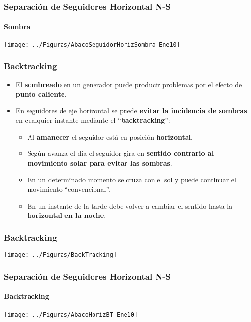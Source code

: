 \documentclass[serif, xcolor=dvipsnames]{beamer}
\begin{document}
\begin{frame}
\frametitle{Separación de Seguidores Horizontal N-S}


\framesubtitle{Sombra}

\begin{center}
\texttt{[image: ../Figuras/AbacoSeguidorHorizSombra\_Ene10]}
\par\end{center}


\end{frame}

\begin{frame}
\frametitle{Backtracking}
\begin{itemize}
\item El \textbf{sombreado} en un generador puede producir problemas por
el efecto de \textbf{punto caliente}.
\item En seguidores de eje horizontal se puede \textbf{evitar la incidencia
de sombras} en cualquier instante mediante el {}``\textbf{backtracking}'':

\begin{itemize}
\item Al \textbf{amanecer} el seguidor está en posición \textbf{horizontal}.
\item Según avanza el día el seguidor gira en \textbf{sentido contrario
al movimiento solar para evitar las sombras}.
\item En un determinado momento se cruza con el sol y puede continuar el
movimiento {}``convencional''.
\item En un instante de la tarde debe volver a cambiar el sentido hasta
la \textbf{horizontal en la noche}.
\end{itemize}
\end{itemize}

\end{frame}

\begin{frame}
\frametitle{Backtracking}

\begin{center}
\texttt{[image: ../Figuras/BackTracking]}
\par\end{center}


\end{frame}

\begin{frame}
\frametitle{Separación de Seguidores Horizontal N-S}


\framesubtitle{Backtracking}

\begin{center}
\texttt{[image: ../Figuras/AbacoHorizBT\_Ene10]}
\par\end{center}


\end{frame}
\end{document}
